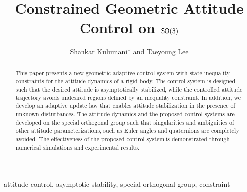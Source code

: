 \documentclass[fleqn]{IJCAS}  %
\begin{document}
\title{\LARGE \textbf{Constrained Geometric Attitude Control on \( \mathsf{SO(3)} \)} }

\author{Shankar Kulumani* and Taeyoung Lee}%

\begin{abstract}
This paper presents a new geometric adaptive control system with state inequality constraints for the attitude dynamics of a rigid body. 
The control system is designed such that the desired attitude is asymptotically stabilized, while the controlled attitude trajectory avoids undesired regions defined by an inequality constraint. 
In addition, we develop an adaptive update law that enables attitude stabilization in the presence of unknown disturbances. 
The attitude dynamics and the proposed control systems are developed on the special orthogonal group such that singularities and ambiguities of other attitude parameterizations, such as Euler angles and quaternions are completely avoided. 
The effectiveness of the proposed control system is demonstrated through numerical simulations and experimental results.
\end{abstract}

\begin{keywords}
attitude control, asymptotic stability, special orthogonal group, constraint
\end{keywords}

\maketitle %

\end{document}
